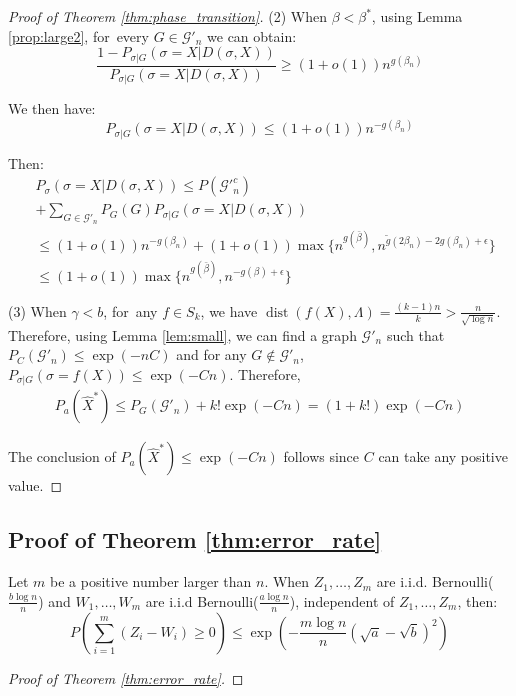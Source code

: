 \documentclass[entropy,article,accept,moreauthors,pdftex]{Definitions/mdpi}
\newcommand{\A}{\frac{a \log n}{n}}
\newcommand{\B}{\frac{b \log n}{n}}
\newcommand{\cG}{\mathcal{G}}
\newcommand{\1}{\mathbbm{1}}
\DeclareMathOperator{\Dist}{dist}
\begin{document}
\begin{paracol}{2}
\begin{proof}[Proof of Theorem \ref{thm:phase_transition}]
	(2) When $\beta < \beta^*$, using Lemma \ref{prop:large2}, for~every $G \in \cG'_n$
	we can obtain:
	$$
	\frac{1-P_{\sigma | G}(\sigma=X | D(\sigma, X))}{P_{\sigma | G}(\sigma=X | D(\sigma, X))}\geq (1+o(1))n^{g(\beta_n)}
	$$
	
	We then have:
	$$
	P_{\sigma | G}(\sigma=X| D(\sigma, X)) \leq (1+o(1)) n^{-g(\beta_n)}
	$$
	
	Then:
	\begin{align*}
	&P_{\sigma}(\sigma=X| D(\sigma, X))  \leq  P(\cG'^c_n) \\
	&+ \sum_{G\in \cG'_n}P_G(G) P_{\sigma|G}(\sigma=X| D(\sigma, X)) \\
	& \leq (1+o(1))n^{-g(\beta_n)} + (1+o(1)) \max\{n^{g(\bar{\beta})}, n^{\tilde{g}(2\beta_n) - 2g(\beta_n) + \epsilon} \}\\
	& \leq (1+o(1)) \max\{n^{g(\bar{\beta})}, n^{-g(\beta) + \epsilon}  \}
	\end{align*}
	
	(3) When $\gamma < b$, for~any $f\in S_k$, we have $\Dist(f(X), \Lambda) = \frac{(k-1)n}{k} > \frac{n}{\sqrt{\log n}}$.
	Therefore, using Lemma \ref{lem:small}, we can find a graph $\cG'_n$ such that $P_C(\cG'_n) \leq \exp(-nC)$
	and for any $G\not \in \cG'_n$, $P_{\sigma |G}(\sigma = f(X)) \leq \exp(-Cn)$. Therefore,
	\begin{align*}
	P_a(\hat{X}^*) \leq P_G(\cG'_n) + k! \exp(-Cn) = (1+k!)\exp(-Cn)
	\end{align*}
	
	The conclusion of $P_a(\hat{X}^*) \leq \exp(-Cn)$ follows since $C$ can take any positive value.
\end{proof}

\subsection{Proof of Theorem \ref{thm:error_rate}}


\begin{Lemma}\label{lem:mZW}
	Let $m$ be a positive number larger than $n$.
	When $Z_1, \dots, Z_m$ are i.i.d. Bernoulli($\B$) and $W_1, \dots, W_m$ are i.i.d Bernoulli($\A$), independent of $Z_1, \dots, Z_m$,
	then:
\begin{equation}
	P(\sum_{i=1}^m (Z_i  - W_i) \geq 0) \leq \exp(-\frac{m \log n}{n}(\sqrt{a} - \sqrt{b})^2)
	\end{equation}
\end{Lemma}
\begin{proof}[Proof of Theorem \ref{thm:error_rate}]


\end{proof}
\end{paracol}
\end{document}

